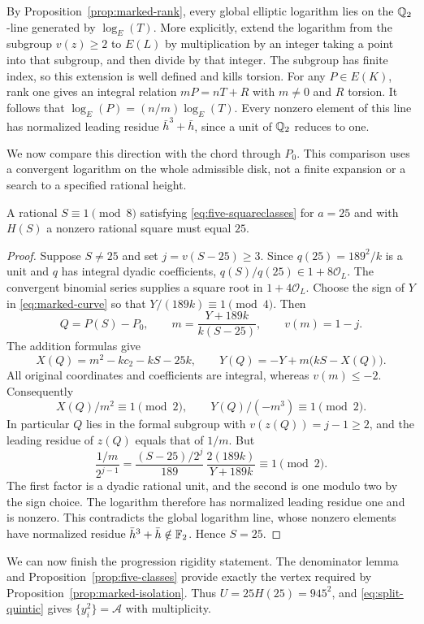 By Proposition~\ref{prop:marked-rank}, every global elliptic logarithm
lies on the $\mathbb Q_2$-line generated by $\log_E(T)$. More explicitly,
extend the logarithm from the subgroup $v(z)\ge2$ to $E(L)$ by
multiplication by an integer taking a point into that subgroup, and
then divide by that integer. The subgroup has finite index, so this
extension is well defined and kills torsion. For any $P\in E(K)$,
rank one gives an integral relation $mP=nT+R$ with $m\ne0$ and $R$
torsion. It follows that $\log_E(P)=(n/m)\log_E(T)$.
Every nonzero element of this line has normalized leading residue
$\bar h^3+\bar h$, since a unit of $\mathbb Q_2$ reduces to one.

We now compare this direction with the chord through $P_0$. This
comparison uses a convergent logarithm on the whole admissible disk,
not a finite expansion or a search to a specified rational height.

\begin{proposition}\label{prop:marked-isolation}
A rational $S\equiv1\pmod8$ satisfying
\eqref{eq:five-squareclasses} for $a=25$ and with $H(S)$ a nonzero
rational square must equal $25$.
\end{proposition}
\begin{proof}
Suppose $S\ne25$ and set $j=v(S-25)\ge3$.
Since $q(25)=189^2/k$ is a unit and $q$ has integral dyadic
coefficients, $q(S)/q(25)\in1+8\mathcal O_L$.
The convergent binomial series supplies a square root in
$1+4\mathcal O_L$. Choose the sign of $Y$ in \eqref{eq:marked-curve}
so that $Y/(189k)\equiv1\pmod4$. Then
\[
 Q=P(S)-P_0,\qquad m=\frac{Y+189k}{k(S-25)},\qquad v(m)=1-j.
\]
The addition formulas give
\[
 X(Q)=m^2-kc_2-kS-25k,\qquad
 Y(Q)=-Y+m\bigl(kS-X(Q)\bigr).
\]
All original coordinates and coefficients are integral, whereas
$v(m)\le-2$. Consequently
\[
 X(Q)/m^2\equiv1\pmod2,\qquad
 Y(Q)/(-m^3)\equiv1\pmod2.
\]
In particular $Q$ lies in the formal subgroup with
$v(z(Q))=j-1\ge2$, and the leading residue of $z(Q)$ equals that
of $1/m$. But
\[
 \frac{1/m}{2^{j-1}}
 =\frac{(S-25)/2^j}{189}\,
   \frac{2(189k)}{Y+189k}\equiv1\pmod2.
\]
The first factor is a dyadic rational unit, and the second is one
modulo two by the sign choice. The logarithm therefore has normalized
leading residue one and is nonzero. This contradicts the global
logarithm line, whose nonzero elements have normalized residue
$\bar h^3+\bar h\notin\mathbb F_2$. Hence $S=25$.
\end{proof}

We can now finish the progression rigidity statement. The denominator
lemma and Proposition~\ref{prop:five-classes} provide exactly the vertex
required by Proposition~\ref{prop:marked-isolation}. Thus
$U=25H(25)=945^2$, and \eqref{eq:split-quintic} gives
$\{y_i^2\}=\mathcal A$ with multiplicity.

